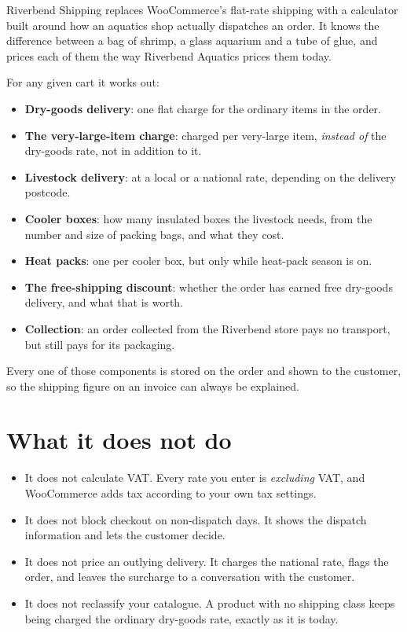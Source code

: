 \documentclass[11pt,a4paper,oneside]{report}
\begin{document}
Riverbend Shipping replaces WooCommerce's flat-rate shipping with a calculator built
around how an aquatics shop actually dispatches an order. It knows the difference
between a bag of shrimp, a glass aquarium and a tube of glue, and prices each of
them the way Riverbend Aquatics prices them today.

For any given cart it works out:

\begin{itemize}
  \item \textbf{Dry-goods delivery}: one flat charge for the ordinary items in the order.
  \item \textbf{The very-large-item charge}: charged per very-large item, \emph{instead of}
        the dry-goods rate, not in addition to it.
  \item \textbf{Livestock delivery}: at a local or a national rate, depending on the
        delivery postcode.
  \item \textbf{Cooler boxes}: how many insulated boxes the livestock needs, from the
        number and size of packing bags, and what they cost.
  \item \textbf{Heat packs}: one per cooler box, but only while heat-pack season is on.
  \item \textbf{The free-shipping discount}: whether the order has earned free dry-goods
        delivery, and what that is worth.
  \item \textbf{Collection}: an order collected from the Riverbend store pays no
        transport, but still pays for its packaging.
\end{itemize}

Every one of those components is stored on the order and shown to the customer, so
the shipping figure on an invoice can always be explained.

\section{What it does not do}

\begin{itemize}
  \item It does not calculate VAT. Every rate you enter is \emph{excluding} VAT, and
        WooCommerce adds tax according to your own tax settings.
  \item It does not block checkout on non-dispatch days. It shows the dispatch
        information and lets the customer decide.
  \item It does not price an outlying delivery. It charges the national rate, flags the
        order, and leaves the surcharge to a conversation with the customer.
  \item It does not reclassify your catalogue. A product with no shipping class keeps
        being charged the ordinary dry-goods rate, exactly as it is today.
\end{itemize}
\end{document}
